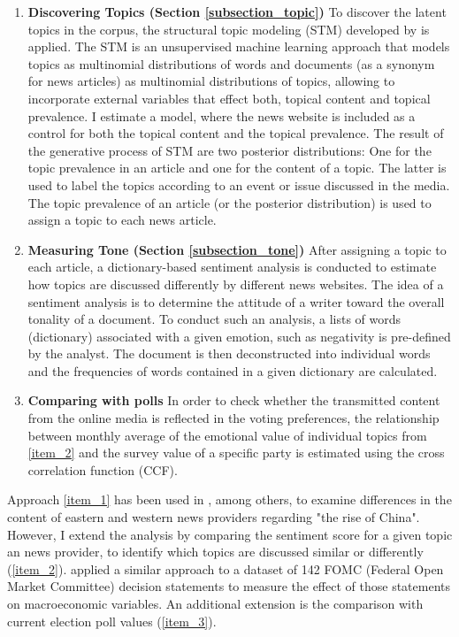 \documentclass[12pt,a4paper,notitlepage]{article}
\begin{document}
\begin{enumerate}
	\item\label{item_1} \textbf{Discovering Topics (Section \ref{subsection_topic})} To discover the latent topics in the corpus, the structural topic modeling (STM) developed by \citet{roberts_model_2016} is applied. The STM is an unsupervised machine learning approach that models topics as multinomial distributions of words and documents (as a synonym for news articles) as multinomial distributions of topics, allowing to incorporate external variables that effect both, topical content and topical prevalence. I estimate a model, where the news website is included as a control for both the topical content and the topical prevalence. The result of the generative process of STM are two posterior distributions: One for the topic prevalence in an article and one for the content of a topic. The latter is used to label the topics according to an event or issue discussed in the media. The topic prevalence of an article (or the posterior distribution) is used to assign a topic to each news article. 
	\item\label{item_2} \textbf{Measuring Tone (Section \ref{subsection_tone})} After assigning a topic to each article, a dictionary-based sentiment analysis is conducted to estimate how topics are discussed differently by different news websites. The idea of a sentiment analysis is to determine the attitude of a writer toward the overall tonality of a document. To conduct such an analysis, a lists of words (dictionary) associated with a given emotion, such as negativity is pre-defined by the analyst. The document is then deconstructed into individual words and the frequencies of words contained in a given dictionary are calculated.
	\item\label{item_3} \textbf{Comparing with polls} In order to check whether the transmitted content from the online media is reflected in the voting preferences, the relationship between monthly average of the emotional value of individual topics from \ref{item_2} and the survey value of a specific party is estimated using the cross correlation function (CCF).
\end{enumerate}

Approach \ref{item_1} has been used in \citet{roberts_model_2016}, among others, to examine differences in the content of eastern and western news providers regarding "the rise of China". However, I extend the analysis by comparing the sentiment score for a given topic an news provider, to identify which topics are discussed similar or differently (\ref{item_2}). \citet{hansen_shocking_2016} applied a similar approach to a dataset of 142 FOMC (Federal Open Market Committee) decision statements to measure the effect of those statements on macroeconomic variables. An additional extension is the comparison with current election poll values (\ref{item_3}). 
\end{document}
